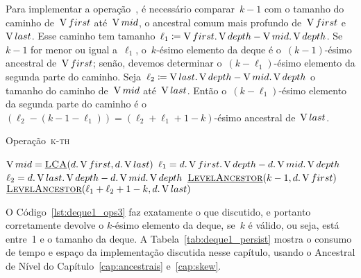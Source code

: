 \documentclass[main.tex]{subfiles}
\begin{document}
Para implementar a operação~, é necessário comparar~$k-1$ com o tamanho do caminho de~$\operatorname{V}{first}$ até~$\operatorname{V}{mid}$, o ancestral comum mais profundo de~$\operatorname{V}{first}$ e~$\operatorname{V}{last}$. Esse caminho tem tamanho~${\ell_1 \coloneqq \operatorname{V}{first}.\operatorname{V}{depth} - \operatorname{V}{mid}.\operatorname{V}{depth}}$. Se~$k-1$ for menor ou igual a~$\ell_1$, o~$k$-ésimo elemento da deque é o~$(k-1)$-ésimo ancestral de~$\operatorname{V}{first}$; senão, devemos determinar o~$(k-\ell_1)$-ésimo elemento da segunda parte do caminho. Seja~${\ell_2 \coloneqq \operatorname{V}{last}.\operatorname{V}{depth} - \operatorname{V}{mid}.\operatorname{V}{depth}}$ o tamanho do caminho de~$\operatorname{V}{mid}$ até~$\operatorname{V}{last}$. Então o~$(k-\ell_1)$-ésimo elemento da segunda parte do caminho é o~$(\ell_2 - (k-1-\ell_1)) = (\ell_2 + \ell_1 + 1 - k)$-ésimo ancestral de~$\operatorname{V}{last}$.

\begin{algorithm}
\caption{Operação~\textsc{k-th}} \label{lst:deque1_ops3}
\begin{algorithmic}[1]

	\State $\operatorname{V}{mid} = \mbox{\textsc{\underline{LCA}}\ensuremath{(d.\operatorname{V}{first}, d.\operatorname{V}{last})}}$
	\State $\ell_1 = d.\operatorname{V}{first}.\operatorname{V}{depth} - d.\operatorname{V}{mid}.\operatorname{V}{depth}$
	\State $\ell_2 = d.\operatorname{V}{last}.\operatorname{V}{depth} - d.\operatorname{V}{mid}.\operatorname{V}{depth}$
		\State \Return $\mbox{\textsc{\underline{LevelAncestor}}\ensuremath{(k - 1, d.\operatorname{V}{first})}}$
	\Else
		\State \Return $\mbox{\textsc{\underline{LevelAncestor}}\ensuremath{(\ell_1 + \ell_2 + 1 - k, d.\operatorname{V}{last})}}$
	\EndIf
\EndFunction

\end{algorithmic}
\end{algorithm}

O Código~\ref{lst:deque1_ops3} faz exatamente o que discutido, e portanto corretamente devolve o $k$-ésimo elemento da deque, se~$k$ é válido, ou seja, está entre~1 e o tamanho da deque. A Tabela~\ref{tab:deque1_persist} mostra o consumo de tempo e espaço da implementação discutida nesse capítulo, usando o Ancestral de Nível do Capítulo~\ref{cap:ancestrais} e~\ref{cap:skew}.
\end{document}
